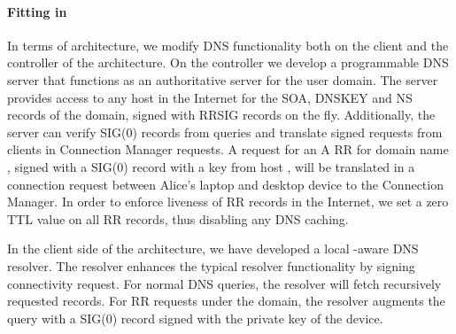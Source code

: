 
\paragraph{Fitting \dnssec in \signpost} In terms of \signpost architecture, we modify DNS
functionality both on the client and the controller of the architecture. On the
controller we develop a programmable DNS server that functions as
an authoritative server for the user domain. The server provides 
\dnssec access to any host in the Internet for the SOA, DNSKEY and NS records of the
domain, signed with RRSIG records on the fly. Additionally, the server
can verify SIG(0) records from queries and translate signed requests from
\signpost clients in Connection Manager requests. A request for an A RR
for domain name , signed with a SIG(0) record with a
key from host , will be translated in a connection request
between Alice's laptop and desktop device to the Connection Manager.
In order to enforce liveness of \signpost RR records in the Internet, we set a zero TTL 
value on all RR records, thus disabling any DNS caching.

In the client side of the \signpost architecture, we have developed a local
\signpost-aware DNS resolver. The resolver enhances the typical resolver
functionality by signing \signpost connectivity request. For normal DNS queries,
the resolver will fetch recursively requested records. For RR requests
under the \signpost domain, the resolver augments the query with a SIG(0) record
signed with the private key of the device. 

